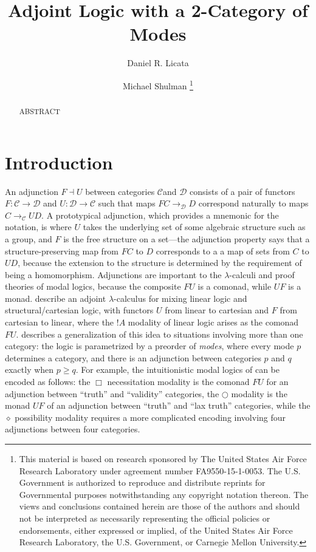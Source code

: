 \documentclass{drl-common/llncs}
\title{Adjoint Logic with a 2-Category of Modes}
\author{Daniel R. Licata\inst{1} \and Michael Shulman\inst{2}
\thanks{
This material is based on research sponsored by The United States Air
Force Research Laboratory under agreement number FA9550-15-1-0053. The
U.S. Government is authorized to reproduce and distribute reprints for
Governmental purposes notwithstanding any copyright notation thereon.
The views and conclusions contained herein are those of the authors and
should not be interpreted as necessarily representing the official
policies or endorsements, either expressed or implied, of the United
States Air Force Research Laboratory, the U.S. Government, or Carnegie
Mellon University.
}}
\institute{Wesleyan University \and University of San Diego}
\begin{document}
\maketitle

\begin{abstract}
ABSTRACT
\end{abstract}

\newcommand{\C}{\ensuremath{\mathcal{C}}}
\newcommand{\D}{\ensuremath{\mathcal{D}}}
\newcommand{\la}{\ensuremath{\dashv}}
\newcommand{\arrow}[3]{\ensuremath{#2 \longrightarrow_{#1} #3}}
\newcommand{\sh}{\text{\textesh}}

\section{Introduction}

An adjunction $F \la U$ between categories \C and \D\/ consists of a
pair of functors $F : \C \to \D$ and $U : \D \to \C$ such that maps
\arrow{\D}{F C}{D} correspond naturally to maps \arrow{\C}{C}{U D}.  A
prototypical adjunction, which provides a mnemonic for the notation, is
where $U$ takes the underlying set of some algebraic structure such as a
group, and $F$ is the free structure on a set---the adjunction property
says that a structure-preserving map from $F C$ to $D$ corresponds to a
a map of sets from $C$ to $U D$, because the extension to the structure
is determined by the requirement of being a homomorphism.  Adjunctions
are important to the $\lambda$-calculi and proof theories of modal
logics, because the composite $FU$ is a comonad, while $UF$ is a monad.
\citet{bentonwadler96adjoint} describe an adjoint $\lambda$-calculus for
mixing linear logic and structural/cartesian logic, with functors $U$
from linear to cartesian and $F$ from cartesian to linear, where the $!
A$ modality of linear logic arises as the comonad $FU$.
\citet{reed09adjoint} describes a generalization of this idea to
situations involving more than one category: the logic is parametrized
by a preorder of \emph{modes}, where every mode $p$ determines a
category, and there is an adjunction between categories $p$ and $q$
exactly when $p \ge q$.  For example, the intuitionistic modal logics of
\citet{pfenningdavies} can be encoded as follows: the $\Box$
necessitation modality is the comonad $FU$ for an adjunction between
``truth'' and ``validity'' categories, the $\bigcirc$ modality is the
monad $UF$ of an adjunction between ``truth'' and ``lax truth''
categories, while the $\diamond$ possibility modality requires a more
complicated encoding involving four adjunctions between four categories.
\end{document}
